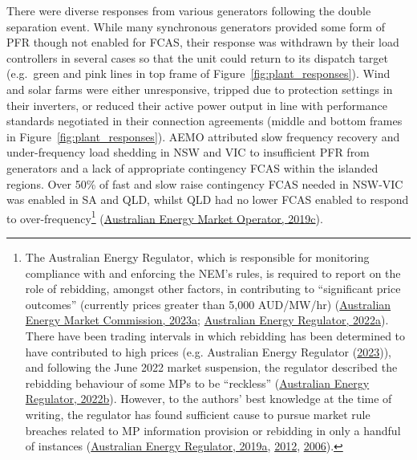 \documentclass[12pt,a4paper,]{report}
\begin{document}
There were diverse responses from various generators following the
double separation event. While many synchronous generators provided some
form of PFR though not enabled for FCAS, their response was withdrawn by
their load controllers in several cases so that the unit could return to
its dispatch target (e.g.~green and pink lines in top frame of
Figure~\ref{fig:plant_responses}). Wind and solar farms were either
unresponsive, tripped due to protection settings in their inverters, or
reduced their active power output in line with performance standards
negotiated in their connection agreements (middle and bottom frames in
Figure~\ref{fig:plant_responses}). AEMO attributed slow frequency
recovery and under-frequency load shedding in NSW and VIC to
insufficient PFR from generators and a lack of appropriate contingency
FCAS within the islanded regions. Over 50\% of fast and slow raise
contingency FCAS needed in NSW-VIC was enabled in SA and QLD, whilst QLD
had no lower FCAS enabled to respond to over-frequency\footnote{The
  Australian Energy Regulator, which is responsible for monitoring
  compliance with and enforcing the NEM's rules, is required to report
  on the role of rebidding, amongst other factors, in contributing to
  ``significant price outcomes'' (currently prices greater than 5,000
  AUD/MW/hr)
  (\protect\hyperlink{ref-australianenergymarketcommissionNationalElectricityRules2023a}{Australian
  Energy Market Commission, 2023a};
  \protect\hyperlink{ref-australianenergyregulatorSignificantPriceReporting2022}{Australian
  Energy Regulator, 2022a}). There have been trading intervals in which
  rebidding has been determined to have contributed to high prices (e.g.
  Australian Energy Regulator
  (\protect\hyperlink{ref-australianenergyregulatorElectricityPrices0002023}{2023})),
  and following the June 2022 market suspension, the regulator described
  the rebidding behaviour of some MPs to be ``reckless''
  (\protect\hyperlink{ref-australianenergyregulatorJune2022Market2022}{Australian
  Energy Regulator, 2022b}). However, to the authors' best knowledge at
  the time of writing, the regulator has found sufficient cause to
  pursue market rule breaches related to MP information provision or
  rebidding in only a handful of instances
  (\protect\hyperlink{ref-australianenergyregulatorPelicanPointPower2019}{Australian
  Energy Regulator, 2019a},
  \protect\hyperlink{ref-australianenergyregulatorQueenslandGeneratorStanwell2012}{2012},
  \protect\hyperlink{ref-australianenergyregulatorInfringementNoticeAGL2006}{2006}).}
(\protect\hyperlink{ref-australianenergymarketoperatorFinalReportQueensland2019}{Australian
Energy Market Operator, 2019c}).
\end{document}
